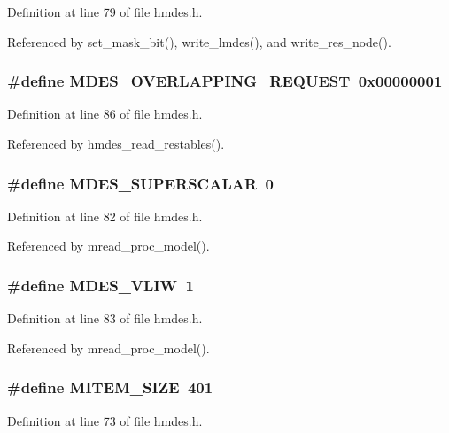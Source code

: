 Definition at line 79 of file hmdes.h.

Referenced by set\_\-mask\_\-bit(), write\_\-lmdes(), and write\_\-res\_\-node().
\subsubsection{\setlength{\rightskip}{0pt plus 5cm}\#define MDES\_\-OVERLAPPING\_\-REQUEST~0x00000001}\label{hmdes_8h_66e95518415e6886ce1ea4fea1f11f2a}




Definition at line 86 of file hmdes.h.

Referenced by hmdes\_\-read\_\-restables().
\subsubsection{\setlength{\rightskip}{0pt plus 5cm}\#define MDES\_\-SUPERSCALAR~0}\label{hmdes_8h_2202ce53709c0e408a63030c29fead58}




Definition at line 82 of file hmdes.h.

Referenced by mread\_\-proc\_\-model().
\subsubsection{\setlength{\rightskip}{0pt plus 5cm}\#define MDES\_\-VLIW~1}\label{hmdes_8h_1dd3b99b38350ea5ad6a1ae70624f7a4}




Definition at line 83 of file hmdes.h.

Referenced by mread\_\-proc\_\-model().
\subsubsection{\setlength{\rightskip}{0pt plus 5cm}\#define MITEM\_\-SIZE~401}\label{hmdes_8h_268d56812ab032343942979976e53ba9}




Definition at line 73 of file hmdes.h.

